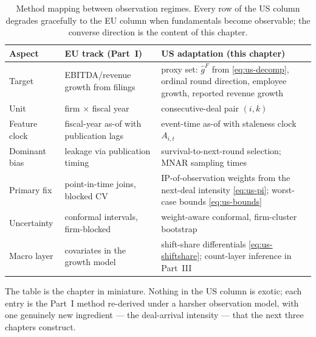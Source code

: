 \begin{table}[htbp]
\centering
\small
\begin{tabular}{p{2.5cm}p{4.6cm}p{5.6cm}}
\toprule
Aspect & EU track (Part~I) & US adaptation (this chapter) \\
\midrule
Target & EBITDA/revenue growth from filings & proxy set: $\hat{g}^{F}$ from
\eqref{eq:us-decomp}, ordinal round direction, employee growth, reported revenue growth \\
Unit & firm $\times$ fiscal year & consecutive-deal pair $(i,k)$ \\
Feature clock & fiscal-year as-of with publication lags & event-time as-of with staleness
clock $A_{i,t}$ \\
Dominant bias & leakage via publication timing & survival-to-next-round selection; MNAR
sampling times \\
Primary fix & point-in-time joins, blocked CV & IP-of-observation weights from the
next-deal intensity \eqref{eq:us-pi}; worst-case bounds \eqref{eq:us-bounds} \\
Uncertainty & conformal intervals, firm-blocked & weight-aware conformal, firm-cluster
bootstrap \\
Macro layer & covariates in the growth model & shift-share differentials
\eqref{eq:us-shiftshare}; count-layer inference in Part~III \\
\bottomrule
\end{tabular}
\caption{Method mapping between observation regimes. Every row of the US column degrades
gracefully to the EU column when fundamentals become observable; the converse direction is
the content of this chapter.}
\label{tab:us-decision}
\end{table}

The table is the chapter in miniature. Nothing in the US column is exotic; each entry is
the Part~I method re-derived under a harsher observation model, with one genuinely new
ingredient --- the deal-arrival intensity --- that the next three chapters construct.
